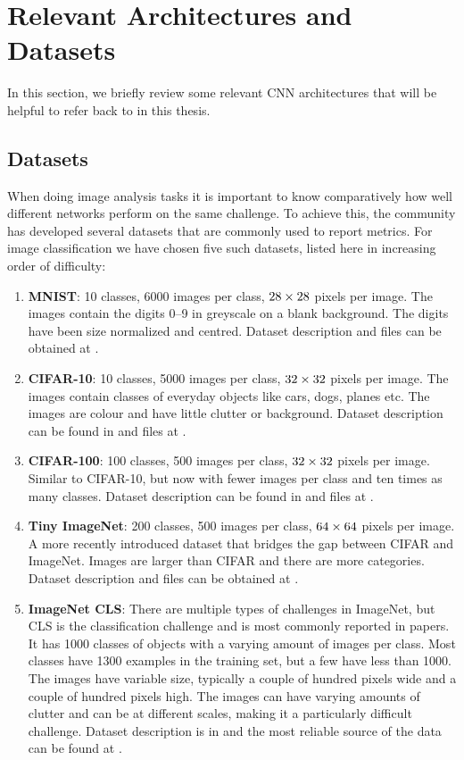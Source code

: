 \section{Relevant Architectures and Datasets}
In this section, we briefly review some relevant CNN architectures that will be
helpful to refer back to in this thesis.

\subsection{Datasets}
When doing image analysis tasks it is important to know comparatively how well
different networks perform on the same challenge. To achieve this, the
community has developed several datasets that are commonly used to report
metrics. For image classification we have chosen five such datasets, listed here in
increasing order of difficulty:
\begin{enumerate}
  \item \textbf{MNIST}: 10 classes, 6000 images per class, $28\times 28$ pixels per image.
    The images contain the digits 0--9 in greyscale on a blank background. The
    digits have been size normalized and centred. Dataset description and files can be obtained
    at \cite{lecun_modified_1998}.
  \item \textbf{CIFAR-10}: 10 classes, 5000 images per class, $32\times 32$ pixels per image.
    The images contain classes of everyday objects like cars, dogs, planes etc.
    The images are colour and have little clutter or background. Dataset
    description can be found in \cite{krizhevsky_learning_2009} and files at
    \cite{krizhevsky_cifar_2009}.
  \item \textbf{CIFAR-100}: 100 classes, 500 images per class, $32\times 32$ pixels per image.
    Similar to CIFAR-10, but now with fewer images per class and ten times as
    many classes. Dataset description can be found in
    \cite{krizhevsky_learning_2009} and files at \cite{krizhevsky_cifar_2009}.
  \item \textbf{Tiny ImageNet}: 200 classes, 500 images per class,
    $64 \times 64$ pixels per image. A more recently introduced dataset that bridges
    the gap between CIFAR and ImageNet. Images are larger than CIFAR and there
    are more categories. Dataset description and files can be obtained at \cite{li_tiny_2017}.
  \item \textbf{ImageNet CLS}: There are multiple types of challenges in ImageNet, but CLS
    is the classification challenge and is most commonly reported in papers.
    It has 1000 classes of objects with a varying amount of images per class.
    Most classes have 1300 examples in the training set, but a few have less
    than 1000. The images have variable size, typically a couple of hundred
    pixels wide and a couple of hundred pixels high. The images can have varying
    amounts of clutter and can be at different scales, making it a particularly
    difficult challenge. Dataset description is in
    \cite{russakovsky_imagenet_2015-1} and the most reliable source of the data
    can be found at \cite{stanford_vision_lab_imagenet_2017}.
\end{enumerate}
